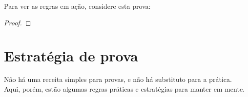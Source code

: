


Para ver as regras em ação, considere esta prova:
\begin{proof}
	\open
	\close
\end{proof}

\section{Estratégia de prova}

Não há uma receita simples para provas, e não há substituto para a prática. Aqui, porém, estão algumas regras práticas e estratégias para manter em mente.

